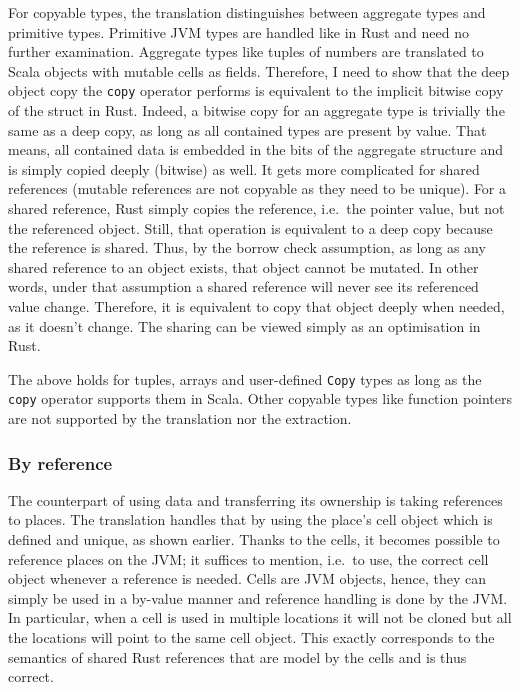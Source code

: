 For copyable types, the translation distinguishes between aggregate types and
primitive types. Primitive JVM types are handled like in Rust and need no
further examination. Aggregate types like tuples of numbers are translated to
Scala objects with mutable cells as fields. Therefore, I need to show that the
deep object copy the \lstinline!copy! operator performs is equivalent to the
implicit bitwise copy of the struct in Rust. Indeed, a bitwise copy for an
aggregate type is trivially the same as a deep copy, as long as all contained
types are present by value. That means, all contained data is embedded in the
bits of the aggregate structure and is simply copied deeply (bitwise) as well.
It gets more complicated for shared references (mutable references are not
copyable as they need to be unique). For a shared reference, Rust simply copies
the reference, i.e.~the pointer value, but not the referenced object. Still,
that operation is equivalent to a deep copy because the reference is shared.
Thus, by the borrow check assumption, as long as any shared reference to an
object exists, that object cannot be mutated. In other words, under that
assumption a shared reference will never see its referenced value change.
Therefore, it is equivalent to copy that object deeply when needed, as it
doesn't change. The sharing can be viewed simply as an optimisation in Rust.

The above holds for tuples, arrays and user-defined \lstinline!Copy! types as
long as the \lstinline!copy! operator supports them in Scala. Other copyable
types like function pointers are not supported by the translation nor the
extraction.

\subsubsection{By reference}

The counterpart of using data and transferring its ownership is taking
references to places. The translation handles that by using the place's cell
object which is defined and unique, as shown earlier. Thanks to the cells, it
becomes possible to reference places on the JVM; it suffices to mention, i.e.~to
use, the correct cell object whenever a reference is needed. Cells are JVM
objects, hence, they can simply be used in a by-value manner and reference
handling is done by the JVM. In particular, when a cell is used in multiple
locations it will not be cloned but all the locations will point to the same
cell object. This exactly corresponds to the semantics of shared Rust references
that are model by the cells and is thus correct.

